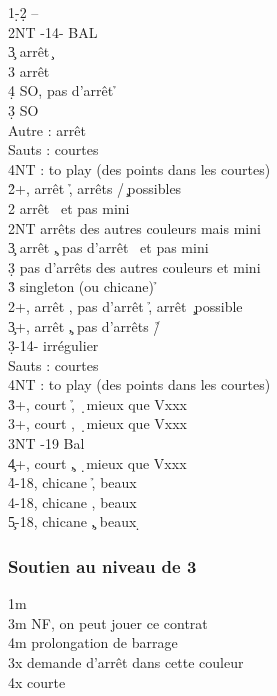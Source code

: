 \documentclass[a4paper]{article}
\begin{document}
\begin{bidtable}
1\d-2\d \> --\\
2NT -14- BAL\+\\
3\c \> arrêt \c \+\\
3\s \> arrêt \s \+\\
4\d \> SO, pas d'arrêt \h \-\-\\
3\d \> SO\\
Autre \> : arrêt\\
Sauts \> : courtes\+\\
4NT \> : to play (des points dans les courtes)\-\-\\
2\h {}+, arrêt \h , arrêts \s /\c\ possibles\+\\
2\s \> arrêt \s\ et pas mini\\
2NT \> arrêts des autres couleurs mais mini\\
3\c \> arrêt \c , pas d'arrêt \s\ et pas mini\\
3\d \> pas d'arrêts des autres couleurs et mini\\
3\h \> singleton (ou chicane) \h \-\\
2\s {}+, arrêt \s , pas d'arrêt \h , arrêt \c\ possible\\
3\c {}+, arrêt \c , pas d'arrêts \h /\s \\
3\d {}-14- irrégulier\+\\
Sauts \> : courtes\+\\
4NT \> : to play (des points dans les courtes)\-\-\\
3\h {}+, court \h , \d\ mieux que Vxxx\\
3\s {}+, court \s , \d\ mieux que Vxxx\\
3NT -19 Bal\\
4\c {}+, court \c , \d\ mieux que Vxxx\\
4\h {}-18, chicane \h , beaux \d \\
4\s {}-18, chicane \s , beaux \d \\
5\c {}-18, chicane \c , beaux \d 
\end{bidtable}

\subsubsection{Soutien au niveau de 3}

\begin{bidtable}
1m\+\\
3m \> NF, on peut jouer ce contrat\+\\
4m \> prolongation de barrage\\
3x \> demande d'arrêt dans cette couleur\\
4x \> courte\-\-
\end{bidtable}
\end{document}
